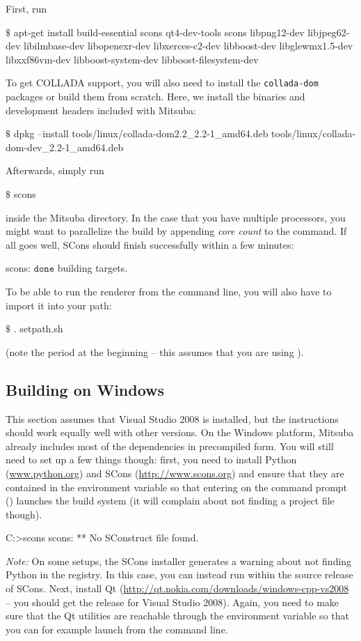 First, run
\begin{shell}
$\text{\$}$ apt-get install build-essential scons qt4-dev-tools scons libpng12-dev libjpeg62-dev libilmbase-dev libopenexr-dev libxerces-c2-dev libboost-dev libglewmx1.5-dev libxxf86vm-dev libboost-system-dev libboost-filesystem-dev
\end{shell}
To get COLLADA support, you will also need to install the \texttt{collada-dom} packages or build them from scratch. Here, we install the  binaries and development headers included with Mitsuba:
\begin{shell}
$\text{\$}$ dpkg --install tools/linux/collada-dom2.2_2.2-1_amd64.deb tools/linux/collada-dom-dev_2.2-1_amd64.deb
\end{shell}
Afterwards, simply run
\begin{shell}
$\text{\$}$ scons
\end{shell}
inside the Mitsuba directory. In the case that you have multiple processors, you might want to parallelize the build by appending \emph{core count} to the command.
If all goes well, SCons should finish successfully within a few minutes:
\begin{shell}
scons: $\texttt{done}$ building targets.
\end{shell}
To be able to run the renderer from the command line, you will also have to import it into your path:
\begin{shell}
$\text{\$}$ . setpath.sh
\end{shell}
(note the period at the beginning -- this assumes that you are using ).

\subsection{Building on Windows}
This section assumes that Visual Studio 2008 is installed, but the instructions should work equally well with other versions.
On the Windows platform, Mitsuba already includes most of the dependencies in precompiled form.
You will still need to set up a few things though: first, you need to install Python 
(\url{www.python.org}) and SCons (\url{http://www.scons.org}) and ensure that they are contained
in the  environment variable so that entering  on the command prompt
() launches the build system (it will complain about not finding a project file though).
\begin{shell}
C:\Users\Wenzel>scons
scons: ** No SConstruct file found.
\end{shell}
\emph{Note: }On some setups, the SCons installer generates a warning about not finding Python in the registry. In this case, you can instead run  within the source release of SCons.
Next, install Qt (\url{http://qt.nokia.com/downloads/windows-cpp-vs2008} -- you should get the release for Visual Studio 2008). Again, you need to make sure that the 
Qt utilities are reachable through the  environment variable so that you can for example launch  from the command line.

